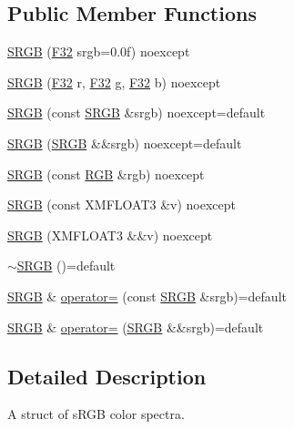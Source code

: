 \subsection*{Public Member Functions}
\begin{DoxyCompactItemize}
\item 
\hyperlink{structmage_1_1_s_r_g_b_a905acfb761908ff8ad8d59d684063638}{S\+R\+GB} (\hyperlink{namespacemage_aa97e833b45f06d60a0a9c4fc22ae02c0}{F32} srgb=0.\+0f) noexcept
\item 
\hyperlink{structmage_1_1_s_r_g_b_ad4bacb51b6f9da7e5347ea1ed6661cd9}{S\+R\+GB} (\hyperlink{namespacemage_aa97e833b45f06d60a0a9c4fc22ae02c0}{F32} r, \hyperlink{namespacemage_aa97e833b45f06d60a0a9c4fc22ae02c0}{F32} g, \hyperlink{namespacemage_aa97e833b45f06d60a0a9c4fc22ae02c0}{F32} b) noexcept
\item 
\hyperlink{structmage_1_1_s_r_g_b_a51840b4b9435da0b99de334eee5c7ac4}{S\+R\+GB} (const \hyperlink{structmage_1_1_s_r_g_b}{S\+R\+GB} \&srgb) noexcept=default
\item 
\hyperlink{structmage_1_1_s_r_g_b_a1bd766958ec4a5ca944b8df29cd75a19}{S\+R\+GB} (\hyperlink{structmage_1_1_s_r_g_b}{S\+R\+GB} \&\&srgb) noexcept=default
\item 
\hyperlink{structmage_1_1_s_r_g_b_a4b56eeabfaee47d0f0685a061947ce59}{S\+R\+GB} (const \hyperlink{structmage_1_1_r_g_b}{R\+GB} \&rgb) noexcept
\item 
\hyperlink{structmage_1_1_s_r_g_b_a279d6676b2515bc746ebaceb517cab87}{S\+R\+GB} (const X\+M\+F\+L\+O\+A\+T3 \&v) noexcept
\item 
\hyperlink{structmage_1_1_s_r_g_b_a0894293b8ff0e7ff8a238356da2057f4}{S\+R\+GB} (X\+M\+F\+L\+O\+A\+T3 \&\&v) noexcept
\item 
\hyperlink{structmage_1_1_s_r_g_b_aa5bb0738c6026da6c3e4f54869c52cbc}{$\sim$\+S\+R\+GB} ()=default
\item 
\hyperlink{structmage_1_1_s_r_g_b}{S\+R\+GB} \& \hyperlink{structmage_1_1_s_r_g_b_a3262793d3b6e70442b591c9a7f907c7f}{operator=} (const \hyperlink{structmage_1_1_s_r_g_b}{S\+R\+GB} \&srgb)=default
\item 
\hyperlink{structmage_1_1_s_r_g_b}{S\+R\+GB} \& \hyperlink{structmage_1_1_s_r_g_b_a8e341bbabae9b0e09c27f3e3fc418950}{operator=} (\hyperlink{structmage_1_1_s_r_g_b}{S\+R\+GB} \&\&srgb)=default
\end{DoxyCompactItemize}


\subsection{Detailed Description}
A struct of s\+R\+GB color spectra. 

